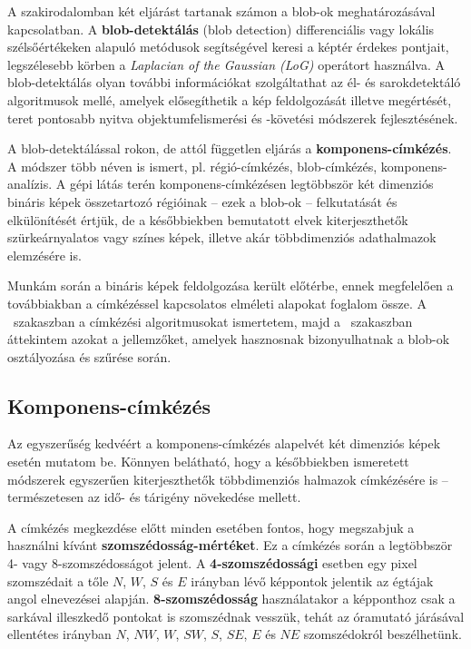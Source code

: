 A szakirodalomban két eljárást tartanak számon a blob-ok meghatározásával kapcsolatban. A \textbf{blob-detektálás} (blob detection) differenciális vagy lokális szélsőértékeken alapuló metódusok segítségével keresi a képtér érdekes pontjait, legszélesebb körben a \emph{Laplacian of the Gaussian (LoG)} operátort használva. A blob-detektálás olyan további információkat szolgáltathat az él- és sarokdetektáló algoritmusok mellé, amelyek elősegíthetik a kép feldolgozását illetve megértését, teret pontosabb nyitva objektumfelismerési és -követési módszerek fejlesztésének.

A blob-detektálással rokon, de attól független eljárás a \textbf{komponens-címkézés}. A módszer több néven is ismert, pl. régió-címkézés, blob-címkézés, komponens-analízis. A gépi látás terén komponens-címkézésen legtöbbször két dimenziós bináris képek összetartozó régióinak -- ezek a blob-ok -- felkutatását és elkülönítését értjük, de a későbbiekben bemutatott elvek kiterjeszthetők szürkeárnyalatos vagy színes képek, illetve akár többdimenziós adathalmazok elemzésére is.

\bigskip

Munkám során a bináris képek feldolgozása került előtérbe, ennek megfelelően a továbbiakban a címkézéssel kapcsolatos elméleti alapokat foglalom össze. A ~szakaszban a címkézési algoritmusokat ismertetem, majd a ~szakaszban áttekintem azokat a jellemzőket, amelyek hasznosnak bizonyulhatnak a blob-ok osztályozása és szűrése során.

\subsection{Komponens-címkézés}\label{sect:blob_cimke}

Az egyszerűség kedvéért a komponens-címkézés alapelvét két dimenziós képek esetén mutatom be. Könnyen belátható, hogy a későbbiekben ismeretett módszerek egyszerűen kiterjeszthetők többdimenziós halmazok címkézésére is -- természetesen az idő- és tárigény növekedése mellett.

\bigskip

A címkézés megkezdése előtt minden esetében fontos, hogy megszabjuk a használni kívánt \textbf{szomszédosság-mértéket}. Ez a címkézés során a legtöbbször 4- vagy 8-szomszédosságot jelent. A \textbf{4-szomszédossági} esetben egy pixel szomszédait a tőle $N$, $W$, $S$ és $E$ irányban lévő képpontok jelentik az égtájak angol elnevezései alapján. \textbf{8-szomszédosság} használatakor a képponthoz csak a sarkával illeszkedő pontokat is szomszédnak vesszük, tehát az óramutató járásával ellentétes irányban $N$, $NW$, $W$, $SW$, $S$, $SE$, $E$ és $NE$ szomszédokról beszélhetünk.

